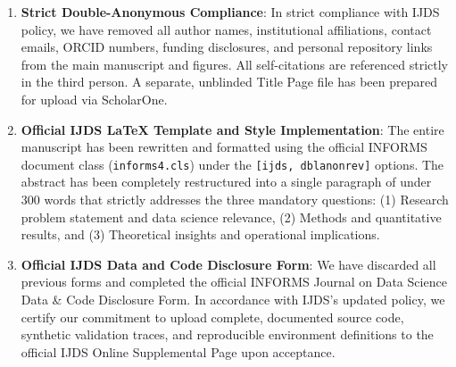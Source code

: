 \documentclass[11pt,letterpaper]{article}
\begin{document}
\begin{enumerate}
    \item \textbf{Strict Double-Anonymous Compliance}: 
    In strict compliance with IJDS policy, we have removed all author names, institutional affiliations, contact emails, ORCID numbers, funding disclosures, and personal repository links from the main manuscript and figures. All self-citations are referenced strictly in the third person. A separate, unblinded Title Page file has been prepared for upload via ScholarOne.

    \item \textbf{Official IJDS LaTeX Template and Style Implementation}:
    The entire manuscript has been rewritten and formatted using the official INFORMS document class (\texttt{informs4.cls}) under the \texttt{[ijds, dblanonrev]} options. The abstract has been completely restructured into a single paragraph of under 300 words that strictly addresses the three mandatory questions: (1) Research problem statement and data science relevance, (2) Methods and quantitative results, and (3) Theoretical insights and operational implications.

    \item \textbf{Official IJDS Data and Code Disclosure Form}:
    We have discarded all previous forms and completed the official INFORMS Journal on Data Science Data \& Code Disclosure Form. In accordance with IJDS's updated policy, we certify our commitment to upload complete, documented source code, synthetic validation traces, and reproducible environment definitions to the official IJDS Online Supplemental Page upon acceptance.


\end{enumerate}
\end{document}
